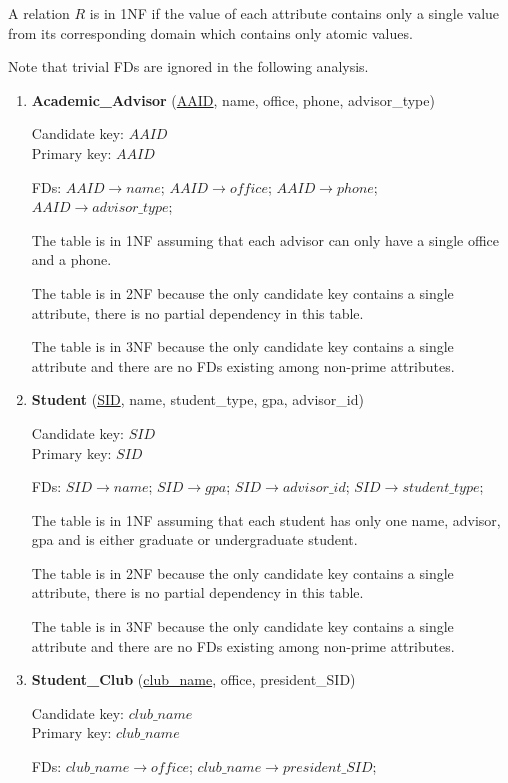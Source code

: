\documentclass[10pt]{article}
\begin{document}
A relation $R$ is in 1NF if the value of each attribute contains only
a single value from its corresponding domain which contains only
atomic values.

Note that trivial FDs are ignored in the following analysis.

\begin{enumerate}
\item \textbf{Academic\_Advisor} (\underline{AAID}, name, office,
  phone, advisor\_type)

  Candidate key: $AAID$\\
  Primary key: $AAID$

  FDs: $AAID \rightarrow name$; $AAID \rightarrow office$; $AAID
  \rightarrow phone$; $AAID \rightarrow advisor\_type$;

  The table is in 1NF assuming that each advisor can only have a
  single office and a phone.

  The table is in 2NF because the only candidate key contains a single
  attribute, there is no partial dependency in this table.

  The table is in 3NF because the only candidate key contains a single
  attribute and there are no FDs existing among non-prime attributes.

\item \textbf{Student} (\underline{SID}, name, student\_type, gpa,
  advisor\_id)

  Candidate key: $SID$\\
  Primary key: $SID$

  FDs: $SID \rightarrow name$; $SID \rightarrow gpa$; $SID
  \rightarrow advisor\_id$; $SID \rightarrow student\_type$;

  The table is in 1NF assuming that each student has only one name,
  advisor, gpa and is either graduate or undergraduate student.

  The table is in 2NF because the only candidate key contains a single
  attribute, there is no partial dependency in this table.

  The table is in 3NF because the only candidate key contains a single
  attribute and there are no FDs existing among non-prime attributes.

\item \textbf{Student\_Club} (\underline{club\_name}, office,
  president\_SID)

  Candidate key: $club\_name$\\
  Primary key: $club\_name$

  FDs: $club\_name \rightarrow office$; $club\_name \rightarrow
  president\_SID$;


\end{enumerate}
\end{document}
